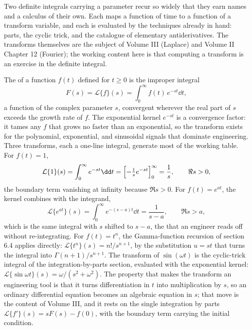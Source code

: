 Two definite integrals carrying a parameter recur so widely that they
earn names and a calculus of their own. Each maps a function of time
to a function of a transform variable, and each is evaluated by the
techniques already in hand: parts, the cyclic trick, and the catalogue
of elementary antiderivatives. The transforms themselves are the
subject of Volume III (Laplace) and Volume II Chapter 12 (Fourier);
the working content here is that computing a transform is an exercise
in the definite integral.

The  of a function $f(t)$ defined for
$t \geq 0$ is the improper integral
\[
F(s) = \mathcal{L}\{f\}(s) = \int_{0}^{\infty} f(t)\,e^{-st}\dd t,
\]
a function of the complex parameter $s$, convergent wherever the real
part of $s$ exceeds the growth rate of $f$. The exponential kernel
$e^{-st}$ is a convergence factor: it tames any $f$ that grows no
faster than an exponential, so the transform exists for the
polynomial, exponential, and sinusoidal signals that dominate
engineering. Three transforms, each a one-line integral, generate most
of the working table. For $f(t) = 1$,
\[
\mathcal{L}\{1\}(s) = \int_{0}^{\infty} e^{-st}\dd t =
\Bigl[-\tfrac{1}{s}e^{-st}\Bigr]_{0}^{\infty} = \frac{1}{s},
\qquad \Re s > 0,
\]
the boundary term vanishing at infinity because $\Re s > 0$. For
$f(t) = e^{at}$, the kernel combines with the integrand,
\[
\mathcal{L}\{e^{at}\}(s) = \int_{0}^{\infty} e^{-(s-a)t}\dd t =
\frac{1}{s - a}, \qquad \Re s > a,
\]
which is the same integral with $s$ shifted to $s - a$, the
 that an engineer reads off without re-integrating.
For $f(t) = t^{n}$, the Gamma-function recursion of section 6.4
applies directly: $\mathcal{L}\{t^{n}\}(s) = n!/s^{n+1}$, by the
substitution $u = st$ that turns the integral into $\Gamma(n+1)/s^{n+1}$.
The transform of $\sin(\omega t)$ is the cyclic-trick integral of the
integration-by-parts section, evaluated with the exponential kernel:
$\mathcal{L}\{\sin\omega t\}(s) = \omega/(s^{2} + \omega^{2})$. The
property that makes the transform an engineering tool is that it turns
differentiation in $t$ into multiplication by $s$, so an ordinary
differential equation becomes an algebraic equation in $s$; that move
is the content of Volume III, and it rests on the single integration by
parts $\mathcal{L}\{f'\}(s) = sF(s) - f(0)$, with the boundary term
carrying the initial condition.

